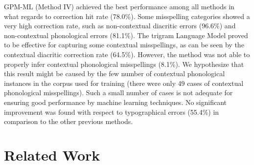 GPM-ML (Method IV) achieved the best performance among all methods in what regards to correction hit rate (78.0\%). Some misspelling categories showed a very high correction rate, such as non-contextual diacritic errors (96.6\%) and non-contextual phonological errors (81.1\%). The trigram Language Model proved to be effective for capturing some contextual misspellings, as can be seen by the contextual diacritic correction rate (64.5\%). However, the method was not able to properly infer contextual phonological misspellings (8.1\%). We hypothesize that this result might be caused by the few number of contextual phonological instances in the corpus used for training (there were only 49 cases of contextual phonological misspellings). Such a small number of cases is not adequate for ensuring good performance by machine learning techniques. No significant improvement was found with respect to typographical errors (55.4\%) in comparison to the other previous methods.


\section{Related Work}\label{sec:related}

